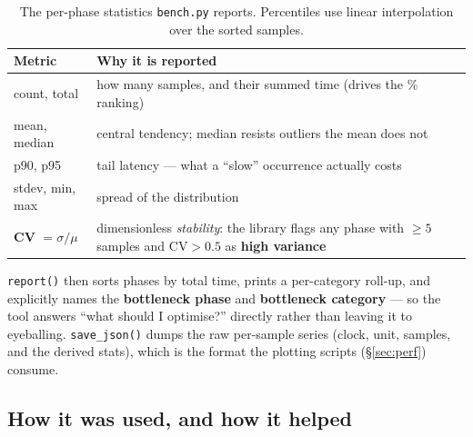 \documentclass[11pt,a4paper]{article}
\newcommand{\code}[1]{\texttt{\small #1}}
\begin{document}
\begin{table}[H]
\centering
\small
\renewcommand{\arraystretch}{1.2}
\begin{tabularx}{\textwidth}{@{}lX@{}}
\toprule
\textbf{Metric} & \textbf{Why it is reported}\\
\midrule
count, total & how many samples, and their summed time (drives the \% ranking)\\
mean, median & central tendency; median resists outliers the mean does not\\
p90, p95 & tail latency --- what a ``slow'' occurrence actually costs\\
stdev, min, max & spread of the distribution\\
\textbf{CV} $=\sigma/\mu$ & dimensionless \emph{stability}: the library flags any
phase with $\ge 5$ samples and $\mathrm{CV}>0.5$ as \textbf{high variance}\\
\bottomrule
\end{tabularx}
\caption{The per-phase statistics \code{bench.py} reports. Percentiles use linear
interpolation over the sorted samples.}
\end{table}

\code{report()} then sorts phases by total time, prints a per-category roll-up,
and explicitly names the \textbf{bottleneck phase} and \textbf{bottleneck
category} --- so the tool answers ``what should I optimise?'' directly rather than
leaving it to eyeballing. \code{save\_json()} dumps the raw per-sample series
(clock, unit, samples, and the derived stats), which is the format the plotting
scripts (\S\ref{sec:perf}) consume.

\subsection{How it was used, and how it helped}
\end{document}

